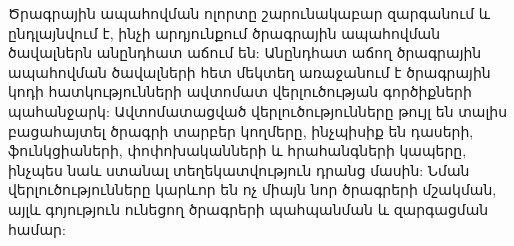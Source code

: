 {
    Ծրագրային ապահովման ոլորտը շարունակաբար զարգանում և ընդլայնվում է, ինչի արդյունքում ծրագրային ապահովման ծավալներն
    անընդհատ աճում են: Անընդհատ աճող ծրագրային ապահովման ծավալների հետ մեկտեղ առաջանում է ծրագրային կոդի հատկությունների
    ավտոմատ վերլուծության գործիքների պահանջարկ: Ավտոմատացված վերլուծությունները թույլ են տալիս բացահայտել ծրագրի տարբեր
    կողմերը, ինչպիսիք են դասերի, ֆունկցիաների, փոփոխականների և հրահանգների կապերը, ինչպես նաև ստանալ տեղեկատվություն
    դրանց մասին: Նման վերլուծությունները կարևոր են ոչ միայն նոր ծրագրերի մշակման, այլև գոյություն ունեցող ծրագրերի
    պահպանման և զարգացման համար:
}